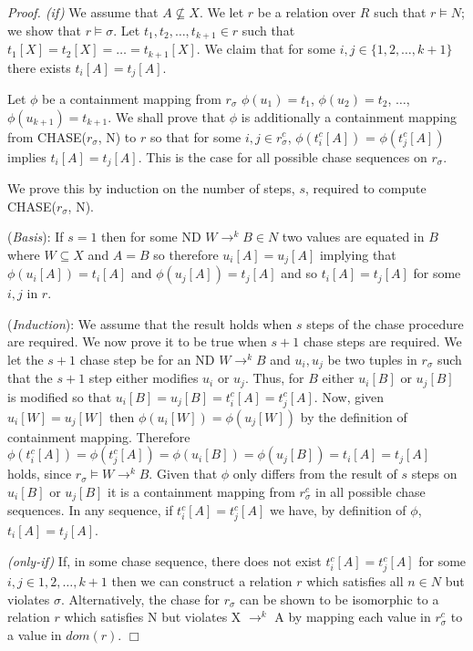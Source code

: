 
{\em Proof. (if)} We assume that $A \not\subseteq X$. We let $r$ be a
relation over $R$ such that $r \models N$; we show that $r \models
\sigma$. Let $t_1, t_2, \ldots, t_{k+1} \in r$ such that $t_1[X] =
t_2[X] = \ldots = t_{k+1}[X]$. We claim that for some $i,
j \in \{1, 2, \ldots, {k+1}\}$ there exists $t_i[A] = t_j[A]$. 

\smallskip
Let $\phi$ be a containment mapping from $r_\sigma$
$\phi(u_1) = t_1$, $\phi(u_2) = t_2$, $\ldots$, $\phi(u_{k+1}) = t_{k+1}$. We
shall prove that $\phi$ is additionally a containment mapping from
CHASE($r_{\sigma}$, N) to $r$ so that for some $i,j \in r_{\sigma}^c$,
$\phi(t_i^c[A])$ = $\phi(t_j^c[A])$ implies $t_i[A] = t_j[A]$. This is
the case for all possible chase sequences on $r_\sigma$. 

\smallskip
We prove this by induction on the number of steps, $s$, required to compute
CHASE($r_{\sigma}$, N).

\smallskip

({\em Basis}):
If $s = 1$ then for some ND $W \to^k B \in N$ two values are equated 
in $B$ where $W \subseteq X$ and $A = B$ so therefore $u_i[A] =
u_j[A]$ implying that $\phi(u_i[A]) = t_i[A]$ and $\phi(u_j[A]) =
t_j[A]$ and so 
$t_i[A] = t_j[A]$ for some $i,j$ in $r$.
\smallskip
 
({\em Induction}):
We assume that the result holds when $s$ steps of the chase procedure
are required. We now prove it to be true when $s+1$ chase steps are
required. We let the $s+1$ chase step be for an ND $W \to^k B$ and
$u_i, u_j$ be two tuples in $r_\sigma$ such that the $s+1$ step either modifies
$u_i$ or $u_j$. Thus, for $B$ either $u_i[B]$ or 
$u_j[B]$ is modified so that $u_i[B] = u_j[B] = t_i^c[A] = t_j^c[A]$.
Now, given $u_i[W] = u_j[W]$ then $\phi(u_i[W]) = \phi(u_j[W])$ by the
definition of containment mapping.  Therefore $\phi(t_i^c[A]) =
\phi(t_j^c[A]) = \phi(u_i[B]) = \phi(u_j[B]) = t_i[A] = t_j[A]$ holds, since $r_{\sigma}
\models W \to^k B$. Given that $\phi$ only differs from the result of
$s$ steps on $u_i[B]$ or $u_j[B]$ it is a containment mapping from
$r_\sigma^c$ in all possible chase sequences. In any sequence, if
$t_i^c[A] = t_j^c[A]$ we have, by definition of $\phi$, $t_i[A] = t_j[A]$.

\smallskip

{ \em (only-if)} If, in some chase sequence, there does not exist
$t_i^c[A] = t_j^c[A]$ for 
some $i,j \in {1,2, \ldots, k+1}$ then we can
construct a relation $r$ 
which satisfies all $n \in N$ but violates $\sigma$.  
\smallskip
Alternatively, the chase for $r_\sigma$ can be shown to be isomorphic
to a relation $r$ which satisfies N but violates X $\to^k$ A by
mapping each value in $r_{\sigma}^c$ to a value in $dom(r)$. $\Box$



